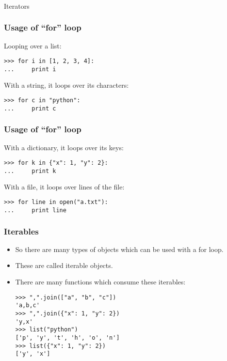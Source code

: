 \begin{frame}[fragile]\frametitle{}
\begin{center}
{\Large Iterators}
\end{center}
\end{frame}

\begin{frame}[fragile]\frametitle{Usage of ``for'' loop}
Looping over a list:
\begin{lstlisting}
>>> for i in [1, 2, 3, 4]:
...     print i
\end{lstlisting}

With a string, it loops over its characters:
\begin{lstlisting}
>>> for c in "python":
...     print c
\end{lstlisting}
\end{frame}

\begin{frame}[fragile]\frametitle{Usage of ``for'' loop}
With a dictionary, it loops over its keys:
\begin{lstlisting}
>>> for k in {"x": 1, "y": 2}:
...     print k
\end{lstlisting}

With a file, it loops over lines of the file:
\begin{lstlisting}
>>> for line in open("a.txt"):
...     print line
\end{lstlisting}
\end{frame}

\begin{frame}[fragile]\frametitle{Iterables}
    \begin{itemize}
    \item  So there are many types of objects which can be used with a for loop. 
    \item These are called iterable objects.
	\item There are many functions which consume these iterables:
	\begin{lstlisting}
>>> ",".join(["a", "b", "c"])
'a,b,c'
>>> ",".join({"x": 1, "y": 2})
'y,x'
>>> list("python")
['p', 'y', 't', 'h', 'o', 'n']
>>> list({"x": 1, "y": 2})
['y', 'x']
\end{lstlisting}
    \end{itemize}
\end{frame}

